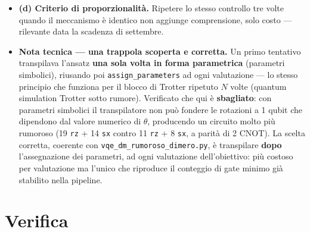\documentclass[11pt,a4paper]{article}
\begin{document}
\begin{itemize}[leftmargin=1.3em,itemsep=0.35em]
\item \textbf{(d) Criterio di proporzionalità.} Ripetere lo stesso
controllo tre volte quando il meccanismo è identico non aggiunge
comprensione, solo costo --- rilevante data la scadenza di settembre.

\item \textbf{Nota tecnica --- una trappola scoperta e corretta.} Un primo
tentativo transpilava l'ansatz \textbf{una sola volta in forma parametrica}
(parametri simbolici), riusando poi \texttt{assign\_parameters} ad ogni
valutazione --- lo stesso principio che funziona per il blocco di Trotter
ripetuto $N$ volte (quantum simulation Trotter sotto rumore).
Verificato che qui è \textbf{sbagliato}: con
parametri simbolici il transpilatore non può fondere le rotazioni a 1
qubit che dipendono dal valore numerico di $\theta$, producendo un
circuito molto più rumoroso (19 \texttt{rz} + 14 \texttt{sx} contro 11
\texttt{rz} + 8 \texttt{sx}, a parità di 2 CNOT). La scelta corretta,
coerente con \texttt{vqe\_dm\_rumoroso\_dimero.py}, è transpilare
\textbf{dopo} l'assegnazione dei parametri, ad ogni valutazione
dell'obiettivo: più costoso per valutazione ma l'unico che riproduce il
conteggio di gate minimo già stabilito nella pipeline.
\end{itemize}

\section*{Verifica}
\end{document}
